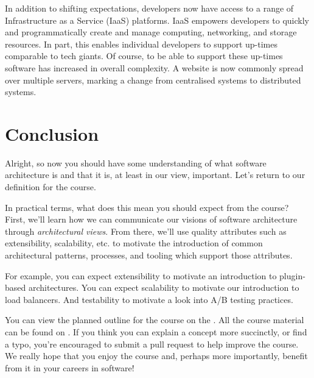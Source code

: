 In addition to shifting expectations, developers now have access to a range of Infrastructure as a Service (IaaS) platforms.
IaaS empowers developers to quickly and programmatically create and manage computing, networking, and storage resources.
In part, this enables individual developers to support up-times comparable to tech giants.
Of course, to be able to support these up-times software has increased in overall complexity.
A website is now commonly spread over multiple servers, marking a change from centralised systems to distributed systems.

\section{Conclusion}

Alright, so now you should have some understanding of what software architecture is and that it is, at least in our view, important.
Let's return to our definition for the course.

\coursedef*

In practical terms, what does this mean you should expect from the course?
First, we'll learn how we can communicate our visions of software architecture through \textsl{architectural views}.
From there, we'll use quality attributes such as extensibility, scalability, etc.
to motivate the introduction of common architectural patterns, processes, and tooling which support those attributes.

For example, you can expect extensibility to motivate an introduction to plugin-based architectures.
You can expect scalability to motivate our introduction to load balancers.
And testability to motivate a look into A/B testing practices.


You can view the planned outline for the course on the .
All the course material can be found on .
If you think you can explain a concept more succinctly, or find a typo, you're encouraged to submit a pull request to help improve the course.
We really hope that you enjoy the course and, perhaps more importantly, benefit from it in your careers in software!